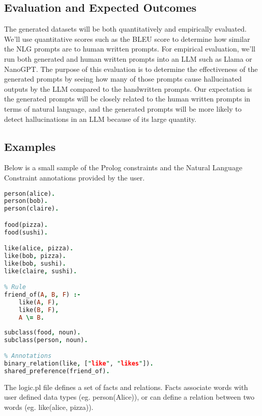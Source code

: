 \documentclass{article}
\begin{document}
\subsection{Evaluation and Expected Outcomes}
The generated datasets will be both quantitatively and empirically evaluated.  We’ll use quantitative scores such as the BLEU score to determine how similar the NLG prompts are to human written prompts.  For empirical evaluation, we’ll run both generated and human written prompts into an LLM such as Llama or NanoGPT.  The purpose of this evaluation is to determine the effectiveness of the generated prompts by seeing how many of those prompts cause hallucinated outputs by the LLM compared to the handwritten prompts.  Our expectation is the generated prompts will be closely related to the human written prompts in terms of natural language, and the generated prompts will be more likely to detect hallucinations in an LLM because of its large quantity.

\subsection{Examples}
Below is a small sample of the Prolog constraints and the Natural Language Constraint annotations provided by the user.


\noindent
\begin{minipage}{0.48\textwidth}
\begin{lstlisting}[language=Prolog]
% Facts
person(alice).
person(bob).
person(claire).

food(pizza).
food(sushi).

like(alice, pizza).
like(bob, pizza).
like(bob, sushi).
like(claire, sushi).

% Rule
friend_of(A, B, F) :-
    like(A, F),
    like(B, F),
    A \= B.
\end{lstlisting}
\end{minipage}
\hfill
\begin{minipage}{0.48\textwidth}
\begin{lstlisting}[language=prolog]
% Type Hierachy
subclass(food, noun).
subclass(person, noun).

% Annotations
binary_relation(like, ["like", "likes"]).
shared_preference(friend_of).
\end{lstlisting}
\end{minipage}

The logic.pl file defines a set of facts and relations.  Facts associate words with user defined data types (eg. person(Alice)), or can define
a relation between two words (eg. like(alice, pizza)).
\end{document}
